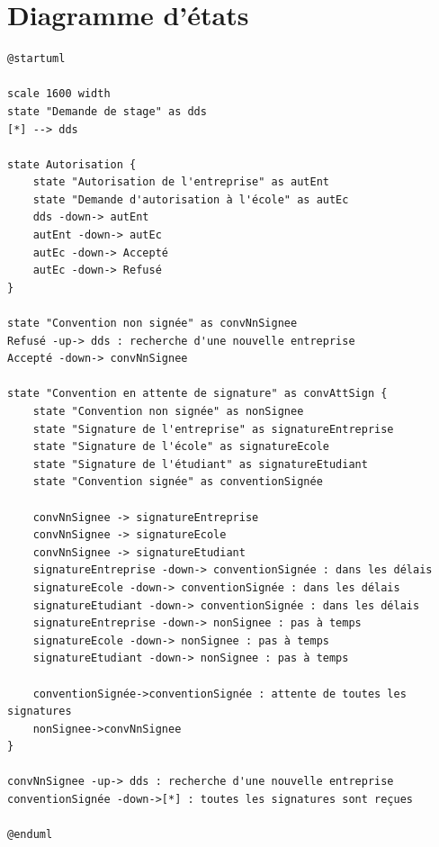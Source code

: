 \documentclass[11pt, a4paper]{report}
\begin{document}
\section*{Diagramme d'états}
\begin{verbatim}
@startuml

scale 1600 width
state "Demande de stage" as dds
[*] --> dds

state Autorisation {
	state "Autorisation de l'entreprise" as autEnt
	state "Demande d'autorisation à l'école" as autEc
	dds -down-> autEnt
	autEnt -down-> autEc
	autEc -down-> Accepté
	autEc -down-> Refusé
}

state "Convention non signée" as convNnSignee
Refusé -up-> dds : recherche d'une nouvelle entreprise
Accepté -down-> convNnSignee

state "Convention en attente de signature" as convAttSign {
	state "Convention non signée" as nonSignee
	state "Signature de l'entreprise" as signatureEntreprise
	state "Signature de l'école" as signatureEcole
	state "Signature de l'étudiant" as signatureEtudiant
	state "Convention signée" as conventionSignée

	convNnSignee -> signatureEntreprise
	convNnSignee -> signatureEcole
	convNnSignee -> signatureEtudiant
	signatureEntreprise -down-> conventionSignée : dans les délais
	signatureEcole -down-> conventionSignée : dans les délais
	signatureEtudiant -down-> conventionSignée : dans les délais
	signatureEntreprise -down-> nonSignee : pas à temps
	signatureEcole -down-> nonSignee : pas à temps
	signatureEtudiant -down-> nonSignee : pas à temps

	conventionSignée->conventionSignée : attente de toutes les signatures
	nonSignee->convNnSignee
}

convNnSignee -up-> dds : recherche d'une nouvelle entreprise
conventionSignée -down->[*] : toutes les signatures sont reçues 

@enduml
\end{verbatim}

\newpage
\end{document}
